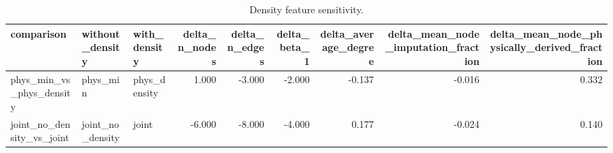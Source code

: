\begin{table}[p]
\centering
\caption{Density feature sensitivity.}
\label{tab:mapper_density_sensitivity}
\begin{adjustbox}{max width=\linewidth}
\begin{tabular}{lllrrrrrr}
\toprule
comparison & without\_density & with\_density & delta\_n\_nodes & delta\_n\_edges & delta\_beta\_1 & delta\_average\_degree & delta\_mean\_node\_imputation\_fraction & delta\_mean\_node\_physically\_derived\_fraction \\
\midrule
phys\_min\_vs\_phys\_density & phys\_min & phys\_density & 1.000 & -3.000 & -2.000 & -0.137 & -0.016 & 0.332 \\
joint\_no\_density\_vs\_joint & joint\_no\_density & joint & -6.000 & -8.000 & -4.000 & 0.177 & -0.024 & 0.140 \\
\bottomrule
\end{tabular}
\end{adjustbox}
\end{table}
